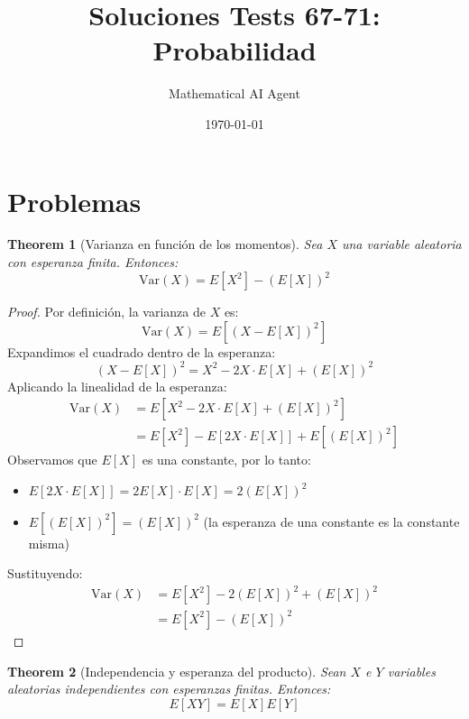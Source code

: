 \documentclass[11pt,a4paper]{article}
\title{Soluciones Tests 67-71: Probabilidad}
\author{Mathematical AI Agent}
\date{\today}
\theoremstyle{plain}
\newtheorem{theorem}{Theorem}[section]
\theoremstyle{definition}
\begin{document}
\maketitle

\section{Problemas}

\begin{theorem}[Varianza en función de los momentos]
Sea $X$ una variable aleatoria con esperanza finita. Entonces:
\[
\text{Var}(X) = E[X^2] - (E[X])^2
\]
\end{theorem}

\begin{proof}
Por definición, la varianza de $X$ es:
\[
\text{Var}(X) = E\left[(X - E[X])^2\right]
\]
Expandimos el cuadrado dentro de la esperanza:
\[
(X - E[X])^2 = X^2 - 2X\cdot E[X] + (E[X])^2
\]
Aplicando la linealidad de la esperanza:
\begin{align*}
\text{Var}(X) &= E\left[X^2 - 2X\cdot E[X] + (E[X])^2\right] \\
&= E[X^2] - E\left[2X\cdot E[X]\right] + E\left[(E[X])^2\right]
\end{align*}
Observamos que $E[X]$ es una constante, por lo tanto:
\begin{itemize}
\item $E\left[2X\cdot E[X]\right] = 2E[X]\cdot E[X] = 2(E[X])^2$
\item $E\left[(E[X])^2\right] = (E[X])^2$ (la esperanza de una constante es la constante misma)
\end{itemize}
Sustituyendo:
\begin{align*}
\text{Var}(X) &= E[X^2] - 2(E[X])^2 + (E[X])^2 \\
&= E[X^2] - (E[X])^2
\end{align*}
\end{proof}

\begin{theorem}[Independencia y esperanza del producto]
Sean $X$ e $Y$ variables aleatorias independientes con esperanzas finitas. Entonces:
\[
E[XY] = E[X]E[Y]
\]
\end{theorem}
\end{document}
